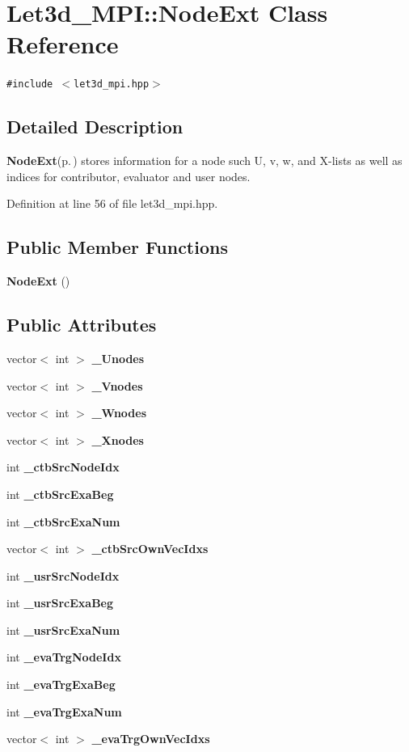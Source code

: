 \section{Let3d\_\-MPI::Node\-Ext Class Reference}
\label{classLet3d__MPI_1_1NodeExt}
{\tt \#include $<$let3d\_\-mpi.hpp$>$}



\subsection{Detailed Description}
{\bf Node\-Ext}{\rm (p.\,\pageref{classLet3d__MPI_1_1NodeExt})} stores information for a node such U, v, w, and X-lists as well as indices for contributor, evaluator and user nodes. 



Definition at line 56 of file let3d\_\-mpi.hpp.\subsection*{Public Member Functions}
\begin{CompactItemize}
\item 
{\bf Node\-Ext} ()
\end{CompactItemize}
\subsection*{Public Attributes}
\begin{CompactItemize}
\item 
vector$<$ int $>$ {\bf \_\-Unodes}
\item 
vector$<$ int $>$ {\bf \_\-Vnodes}
\item 
vector$<$ int $>$ {\bf \_\-Wnodes}
\item 
vector$<$ int $>$ {\bf \_\-Xnodes}
\item 
int {\bf \_\-ctb\-Src\-Node\-Idx}
\item 
int {\bf \_\-ctb\-Src\-Exa\-Beg}
\item 
int {\bf \_\-ctb\-Src\-Exa\-Num}
\item 
vector$<$ int $>$ {\bf \_\-ctb\-Src\-Own\-Vec\-Idxs}
\item 
int {\bf \_\-usr\-Src\-Node\-Idx}
\item 
int {\bf \_\-usr\-Src\-Exa\-Beg}
\item 
int {\bf \_\-usr\-Src\-Exa\-Num}
\item 
int {\bf \_\-eva\-Trg\-Node\-Idx}
\item 
int {\bf \_\-eva\-Trg\-Exa\-Beg}
\item 
int {\bf \_\-eva\-Trg\-Exa\-Num}
\item 
vector$<$ int $>$ {\bf \_\-eva\-Trg\-Own\-Vec\-Idxs}
\end{CompactItemize}


